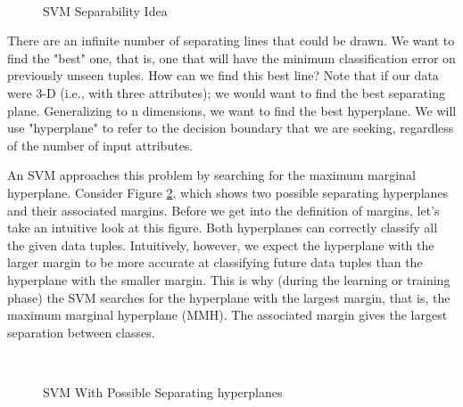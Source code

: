 \begin{figure}[h]
\begin{dBox}
\centering
  \mbox{
   }
   \caption{SVM Separability Idea \cite{classifications}\label{fig:svm1} }   
\end{dBox}   
\end{figure}

There are an infinite number of separating lines that could be drawn. We want to find the "best" one, that is, one that will have the minimum classification error on previously unseen tuples. How can we find this best line? Note that if our data were 3-D (i.e., with three attributes); we would want to find the best separating plane. Generalizing to n dimensions, we want to find the best hyperplane. We will use "hyperplane" to refer to the decision boundary that we are seeking, regardless of the number of input attributes.\bigskip

An SVM approaches this problem by searching for the maximum marginal hyperplane. Consider Figure \ref{fig:svm2}, which shows two possible separating hyperplanes and their associated margins. Before we get into the definition of margins, let's take an intuitive look at this figure. Both hyperplanes can correctly classify all the given data tuples. Intuitively, however, we expect the hyperplane with the larger margin to be more accurate at classifying future data tuples than the hyperplane with the smaller margin. This is why (during the learning or training phase) the SVM searches for the hyperplane with the largest margin, that is, the maximum marginal hyperplane (MMH). The associated margin gives the largest separation between classes.
\bigskip
\begin{figure}[h]
\begin{dBox}
\centering
  \mbox{
   }
   \caption{SVM With Possible Separating hyperplanes \cite{classifications}\label{fig:svm2} }   
\end{dBox}   
\end{figure}

